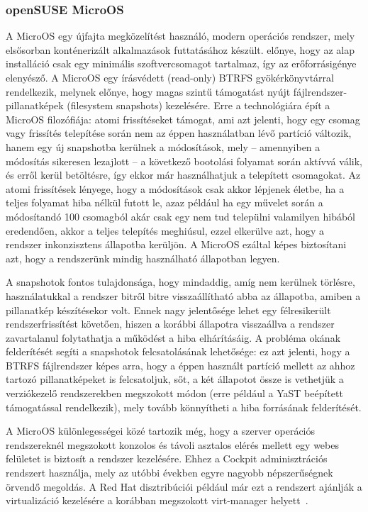 \subsubsection{openSUSE MicroOS}
A MicroOS egy újfajta megközelítést használó, modern operációs rendszer, mely elsősorban konténerizált alkalmazások futtatásához készült.  előnye, hogy az alap installáció csak egy minimális szoftvercsomagot tartalmaz, így az erőforrásigénye elenyésző. A MicroOS egy írásvédett (read-only) BTRFS gyökérkönyvtárral rendelkezik, melynek előnye, hogy magas szintű támogatást nyújt fájlrendszer-pillanatképek (filesystem snapshots) kezelésére.
Erre a technológiára épít a MicroOS filozófiája: atomi frissítéseket támogat, ami azt jelenti, hogy egy csomag vagy frissítés telepítése során nem az éppen használatban lévő partíció változik, hanem egy új snapshotba kerülnek a módosítások, mely -- amennyiben a módosítás sikeresen lezajlott -- a következő bootolási folyamat során aktívvá válik, és  erről kerül betöltésre, így ekkor már használhatjuk a telepített csomagokat. Az atomi frissítések lényege, hogy a módosítások csak akkor lépjenek életbe, ha a teljes folyamat hiba nélkül futott le, azaz például ha egy művelet során a módosítandó 100 csomagból akár csak egy nem tud települni valamilyen hibából eredendően, akkor a teljes telepítés meghiúsul, ezzel elkerülve azt, hogy a rendszer inkonzisztens állapotba kerüljön. A MicroOS ezáltal képes biztosítani azt, hogy a rendszerünk mindig használható állapotban legyen.

A snapshotok fontos tulajdonsága, hogy mindaddig, amíg nem kerülnek törlésre, használatukkal a rendszer bitről bitre visszaállítható abba az állapotba, amiben a pillanatkép készítésekor volt. Ennek nagy jelentősége lehet egy félresikerült rendszerfrissítést követően, hiszen a korábbi állapotra visszaállva a rendszer zavartalanul folytathatja a működést a hiba elhárításáig.
A probléma okának felderítését segíti a snapshotok felcsatolásának lehetősége: ez azt jelenti, hogy a BTRFS fájlrendszer képes arra, hogy a éppen használt partíció mellett az ahhoz tartozó pillanatképeket is felcsatoljuk, sőt, a két állapotot össze is vethetjük a verziókezelő rendszerekben megszokott módon (erre például a YaST beépített támogatással rendelkezik), mely tovább könnyítheti a hiba forrásának felderítését.

A MicroOS különlegességei közé tartozik még, hogy a szerver operációs rendszereknél megszokott konzolos és távoli asztalos elérés mellett egy webes felületet is biztosít a rendszer kezelésére. Ehhez a Cockpit adminisztrációs rendszert használja, mely az utóbbi években egyre nagyobb népszerűségnek örvendő megoldás. A Red Hat disztribúciói például már ezt a rendszert ajánlják a virtualizáció kezelésére a korábban megszokott virt-manager helyett~\cite{RHELDeprecated}.

